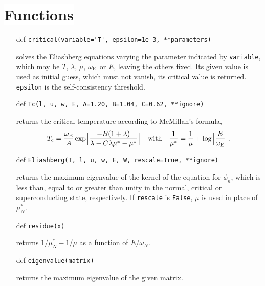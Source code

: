 \documentclass[a4paper]{article}
\def\sub#1{\sb{\mathrm{#1}}}
\def\headline#1{\section*{\normalsize\normalfont%
   \rlap{\rule[0.5ex]{\textwidth}{0.4pt}}\qquad\colorbox{white}{#1}}}
\begin{document}
   \headline{Functions}

   \begin{itemize}
      \item[def] \verb|critical(variable='T', epsilon=1e-3, **parameters)|

      solves the Eliashberg equations varying the parameter indicated by
      \verb|variable|, which may be $T$, $\lambda$, $\mu$, $\omega \sub E$ or
      $E$, leaving the others fixed. Its given value is used as initial guess,
      which must not vanish, its critical value is returned. \verb|epsilon| is
      the self-consistency threshold.

      \item[def] \verb|Tc(l, u, w, E, A=1.20, B=1.04, C=0.62, **ignore)|

      returns the critical temperature according to McMillan's formula,
      \begin{equation*}
         T \sub c = \frac {\omega \sub E} A \exp
         \Bigl[ \frac{-B (1 + \lambda)}{\lambda - C \lambda \mu^* - \mu^*} \Bigr]
         \quad \text{with} \quad
         \frac 1 {\mu^*} =
         \frac 1 \mu + \log \Bigl[ \frac E {\omega \sub E} \Bigr].
      \end{equation*}

      \item[def] \verb|Eliashberg(T, l, u, w, E, W, rescale=True, **ignore)|

      returns the maximum eigenvalue of the kernel of the equation for $\phi_n$,
      which is less than, equal to or greater than unity in the normal, critical
      or superconducting state, respectively. If \verb|rescale| is \verb|False|,
      $\mu$ is used in place of $\mu^*_N$.

      \item[def] \verb|residue(x)|

      returns $1 / \mu^*_N - 1 / \mu$ as a function of $E / \omega_N$.

      \item[def] \verb|eigenvalue(matrix)|

      returns the maximum eigenvalue of the given matrix.
   \end{itemize}
\end{document}
